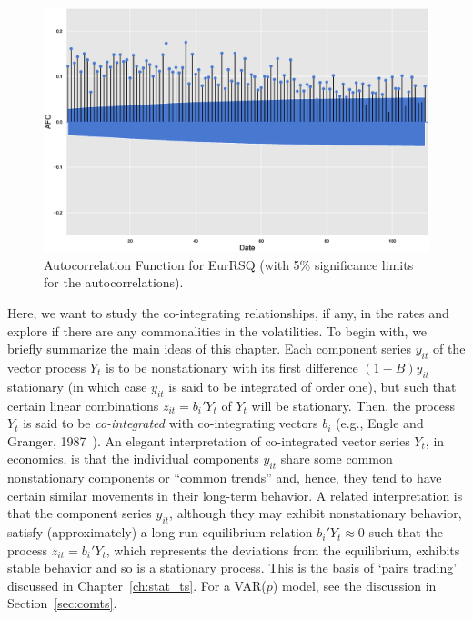 	\begin{figure}[!ht]
	\centering
	\includegraphics[width=\textwidth]{chapters/chapter_mvts/figures/pautofun3.eps}
	\caption{Autocorrelation Function for EurRSQ (with 5\% significance limits for the autocorrelations). \label{fig:pautofun3}}
	\end{figure}


Here, we want to study the co-integrating relationships, if any, in the rates and explore if there are any commonalities in the volatilities. To begin with, we briefly summarize the main ideas of this chapter. Each component series $y_{it}$ of the vector process $Y_t$ is to be nonstationary with its first difference $(1 - B) y_{it}$ stationary (in which case $y_{it}$ is said to be integrated of order one), but such that certain linear combinations $z_{it} = b_i' Y_t $ of $Y_t$ will be stationary. Then, the process $Y_t$ is said to be \emph{co-integrated} with co-integrating vectors $b_i$ (e.g., Engle and Granger, 1987~\cite{engle1987co}). An elegant interpretation of co-integrated vector series $Y_t$, in economics, is that the individual components $y_{it}$ share some common nonstationary components or ``common trends'' and, hence, they tend to have certain similar movements in their long-term behavior. A related interpretation is that the component series $y_{it}$, although they may exhibit nonstationary behavior, satisfy (approximately) a long-run equilibrium relation $b_i' Y_t \approx 0$ such that the process $z_{it} = b_i' Y_t$, which represents the deviations from the equilibrium, exhibits stable behavior and so is a stationary process. This is the basis of `pairs trading' discussed in Chapter~\ref{ch:stat_ts}. For a VAR($p$) model, see the discussion in Section~\ref{sec:comts}.



